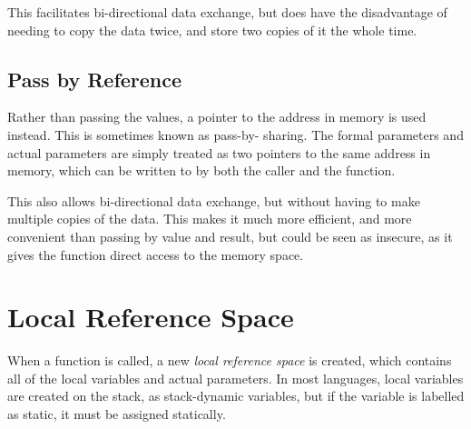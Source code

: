 This facilitates bi-directional data exchange, but does have the disadvantage of needing to copy the data twice, and
 store two copies of it the whole time.

\subsection*{Pass by Reference}

Rather than passing the values, a pointer to the address in memory is used instead. This is sometimes known as pass-by-
sharing. The formal parameters and actual parameters are simply treated as two pointers to the same address in memory,
 which can be written to by both the caller and the function.
 
This also allows bi-directional data exchange, but without having to make multiple copies of the data. This makes it much
 more efficient, and more convenient than passing by value and result, but could be seen as insecure, as it gives the
 function direct access to the memory space.

\section*{Local Reference Space}

When a function is called, a new \textit{local reference space} is created, which contains all of the local variables
 and actual parameters. In most languages, local variables are created on the stack, as stack-dynamic variables, but if
 the variable is labelled as static, it must be assigned statically.